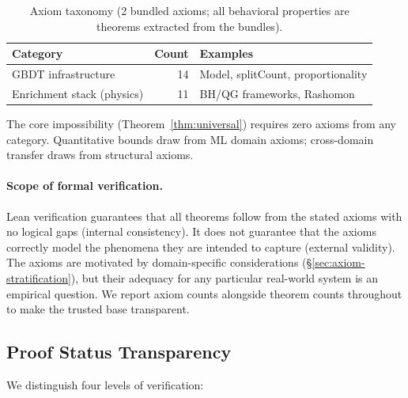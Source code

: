 \documentclass[11pt,a4paper]{article}
\begin{document}
\begin{table}[h]
\centering
\small
\caption{Axiom taxonomy (2 bundled axioms; all behavioral properties are theorems extracted from the bundles).}
\label{tab:axiom-taxonomy}
\begin{tabular}{lrl}
\toprule
Category & Count & Examples \\
\midrule
GBDT infrastructure & 14 & Model, splitCount, proportionality \\
Enrichment stack (physics) & 11 & BH/QG frameworks, Rashomon \\
\bottomrule
\end{tabular}
\end{table}

\noindent The core impossibility (Theorem~\ref{thm:universal}) requires zero axioms from any category. Quantitative bounds draw from ML domain axioms; cross-domain transfer draws from structural axioms.

\paragraph{Scope of formal verification.}
Lean verification guarantees that all theorems follow from the stated axioms with no logical gaps (internal consistency). It does not guarantee that the axioms correctly model the phenomena they are intended to capture (external validity). The axioms are motivated by domain-specific considerations (\S\ref{sec:axiom-stratification}), but their adequacy for any particular real-world system is an empirical question. We report axiom counts alongside theorem counts throughout to make the trusted base transparent.

\subsection{Proof Status Transparency}
\label{sec:proof-status}

We distinguish four levels of verification:
\end{document}
